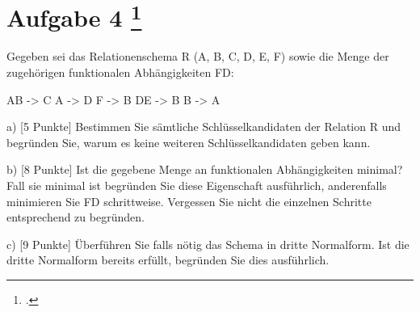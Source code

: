 \documentclass{lehramt-informatik-aufgabe}
\begin{document}
\section{Aufgabe 4
\footcite{examen:66116:2019:09}}

Gegeben sei das Relationenschema R (A, B, C, D, E, F) sowie die Menge
der zugehörigen funktionalen Abhängigkeiten FD:

AB -> C
A -> D
F -> B
DE -> B
B -> A

a) [5 Punkte] Bestimmen Sie sämtliche Schlüsselkandidaten der Relation R
und begründen Sie, warum es keine weiteren Schlüsselkandidaten geben
kann.

b) [8 Punkte] Ist die gegebene Menge an funktionalen Abhängigkeiten
minimal? Fall sie minimal ist begründen Sie diese Eigenschaft
ausführlich, anderenfalls minimieren Sie FD schrittweise. Vergessen Sie
nicht die einzelnen Schritte entsprechend zu begründen.

c) [9 Punkte] Überführen Sie falls nötig das Schema in dritte
Normalform. Ist die dritte Normalform bereits erfüllt, begründen Sie
dies ausführlich.
\end{document}
